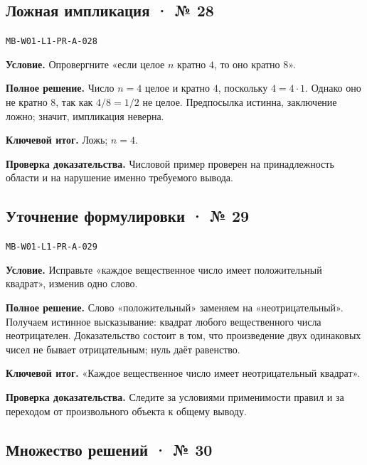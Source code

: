 \documentclass[11pt,a4paper,openany]{book}
\newcommand{\muid}[1]{\texttt{\footnotesize #1}}
\begin{document}
\subsection*{Ложная импликация · № 28}\hypertarget{solution:MB-W01-L1-PR-A-028}{}

\muid{MB-W01-L1-PR-A-028}\par

\textbf{Условие.} Опровергните «если целое $n$ кратно $4$, то оно кратно $8$».\par

\textbf{Полное решение.} Число $n=4$ целое и кратно $4$, поскольку $4=4\cdot1$. Однако оно не кратно $8$, так как $4/8=1/2$ не целое. Предпосылка истинна, заключение ложно; значит, импликация неверна.


\begin{learnbox}\textbf{Ключевой итог.} Ложь; $n=4$.\par \textbf{Проверка доказательства.} 
Числовой пример проверен на принадлежность области и на нарушение именно требуемого вывода. 
\end{learnbox}

\subsection*{Уточнение формулировки · № 29}\hypertarget{solution:MB-W01-L1-PR-A-029}{}

\muid{MB-W01-L1-PR-A-029}\par

\textbf{Условие.} Исправьте «каждое вещественное число имеет положительный квадрат», изменив одно слово.\par

\textbf{Полное решение.} Слово «положительный» заменяем на «неотрицательный». Получаем истинное высказывание: квадрат любого вещественного числа неотрицателен. Доказательство состоит в том, что произведение двух одинаковых чисел не бывает отрицательным; нуль даёт равенство.


\begin{learnbox}\textbf{Ключевой итог.} «Каждое вещественное число имеет неотрицательный квадрат».\par \textbf{Проверка доказательства.} 
Следите за условиями применимости правил и за переходом от произвольного объекта к общему выводу. 
\end{learnbox}

\subsection*{Множество решений · № 30}\hypertarget{solution:MB-W01-L1-PR-A-030}{}
\end{document}
